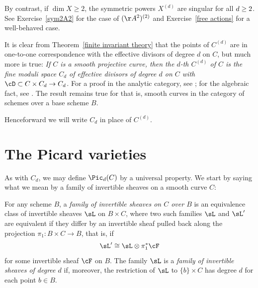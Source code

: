 By contrast, if $\dim X \geq 2$, the symmetric powers $X^{(d)}$ are
singular for all $d \geq \nobreak 2$.
See Exercise~\ref{sym2A2} for the case of $(\AA^2)^{(2)}$ and Exercise~\ref{free actions} for a well-behaved case.
\vspace{3pt}

\begin{fact}\label{universal property of symmetric power}
It is clear from Theorem~\ref{finite invariant theory} that the points
of $C^{(d)}$ are in one-to-one correspondence with the effective
divisors of degree $d$ on $C$, but much more is true: 
\smallbreak
{\it
If $C$ is a smooth projective curve, then the $d$-th 
%
$C^{(d)}$ of $C$ is the 
fine moduli space 
%
$C_d$ of effective divisors of degree $d$ on $C$ with 
%
%
$\cD\subset C\times C_d \to C_d$.
}
\smallbreak
For a proof in the analytic category, see \cite[p.\,164]{ACGH}; 
for the algebraic fact, see \cite[Remark 9.3.9]{Kleiman-PicardScheme}. 
The result remains true for 
%
 that is, smooth curves in
the category of schemes over a base scheme $B$.
\end{fact}

Henceforward we will write $C_d$ in place of $C^{(d)}$.



\section{The Picard varieties}\label{Picard section}

As with $C_d$, we may define $\Pic_d(C)$ by a universal property. We start by saying what we mean by a family of invertible sheaves on a smooth curve $C$:

\begin{definition}
For any scheme $B$, a \emph{family of invertible sheaves on $C$ over $B$} 
%
is an equivalence class of invertible sheaves $\sL$ on $B\times C$, 
where two such
 families $\sL$ and $\sL'$ are equivalent if they differ by an invertible sheaf pulled back along the projection $\pi_1: B\times C \to B$, that is, if
 $$
 \sL' \cong \sL \otimes \pi_1^*\cF
 $$
for some invertible sheaf $\cF$ on $B$.
The family $\sL$  is a \emph{family of invertible sheaves of degree $d$} if, moreover, the restriction of $\sL$
 to $\{b\}\times C$ has degree $d$ for each point $b\in B$. 
 \end{definition}

